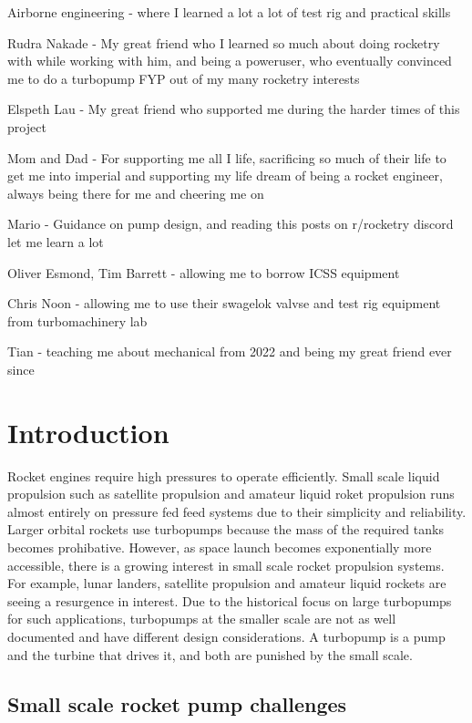 Airborne engineering
- where I learned a lot a lot of test rig and practical skills

Rudra Nakade
- My great friend who I learned so much about doing rocketry with while working with him, and being a poweruser, who eventually convinced me to do a turbopump FYP out of my many rocketry interests

Elspeth Lau
- My great friend who supported me during the harder times of this project

Mom and Dad
- For supporting me all I life, sacrificing so much of their life to get me into imperial and supporting my life dream of being a rocket engineer, always being there for me and cheering me on

Mario
- Guidance on pump design, and reading this posts on r/rocketry discord let me learn a lot

Oliver Esmond, Tim Barrett
- allowing me to borrow ICSS equipment

Chris Noon
- allowing me to use their swagelok valvse and test rig equipment from turbomachinery lab

Tian
- teaching me about mechanical from 2022 and being my great friend ever since


\section{Introduction}

Rocket engines require high pressures to operate efficiently. Small scale liquid propulsion such as satellite propulsion and amateur liquid roket propulsion runs almost entirely on pressure fed feed systems due to their simplicity and reliability. Larger orbital rockets use turbopumps because the mass of the required tanks becomes prohibative. However, as space launch becomes exponentially more accessible, there is a growing interest in small scale rocket propulsion systems. For example, lunar landers, satellite propulsion and amateur liquid rockets are seeing a resurgence in interest. Due to the historical focus on large turbopumps for such applications, turbopumps at the smaller scale are not as well documented and have different design considerations. A turbopump is a pump and the turbine that drives it, and both are punished by the small scale.

\subsection{Small scale rocket pump challenges}

